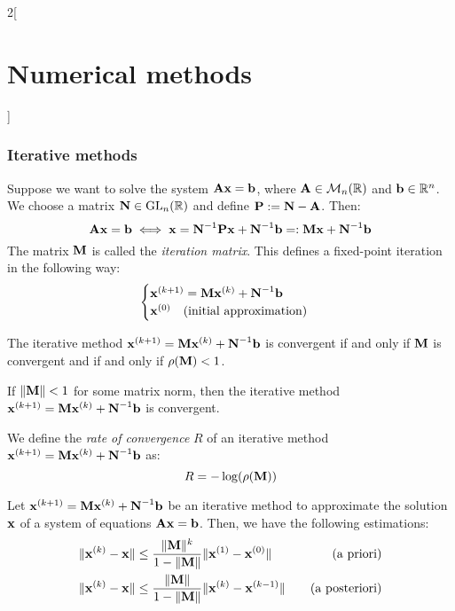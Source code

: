 \documentclass[../../../main_math.tex]{subfiles}
\begin{document}
\begin{multicols}{2}[\section{Numerical methods}]
  \subsubsection{Iterative methods}
  \begin{definition}
    Suppose we want to solve the system $\vf{A}\vf{x}=\vf{b}$, where $\vf{A}\in\mathcal{M}_n(\RR)$ and $\vf{b}\in\RR^n$. We choose a matrix $\vf{N}\in\GL_n(\RR)$ and define $\vf{P}:=\vf{N}-\vf{A}$. Then: $$\vf{A}\vf{x}=\vf{b}\iff \vf{x}=\vf{N}^{-1}\vf{P}\vf{x}+\vf{N}^{-1}\vf{b}=:\vf{M}\vf{x}+\vf{N}^{-1}\vf{b}$$ The matrix $\vf{M}$ is called the \emph{iteration matrix}. This defines a fixed-point iteration in the following way:
    \begin{equation*}
      \begin{cases}
        \vf{x}^{(k+1)}=\vf{M}\vf{x}^{(k)}+\vf{N}^{-1}\vf{b} \\
        \vf{x}^{(0)}\quad\text{(initial approximation)}
      \end{cases}
    \end{equation*}
  \end{definition}
  \begin{theorem}
    The iterative method $\vf{x}^{(k+1)}=\vf{M}\vf{x}^{(k)}+\vf{N}^{-1}\vf{b}$ is convergent if and only if $\vf{M}$ is convergent and if and only if $\rho(\vf{M})<1$.
  \end{theorem}
  \begin{corollary}
    If $\|\vf{M}\|<1$ for some matrix norm, then the iterative method $\vf{x}^{(k+1)}=\vf{M}\vf{x}^{(k)}+\vf{N}^{-1}\vf{b}$ is convergent.
  \end{corollary}
  \begin{definition}
    We define the \emph{rate of convergence} $R$ of an iterative method $\vf{x}^{(k+1)}=\vf{M}\vf{x}^{(k)}+\vf{N}^{-1}\vf{b}$ as: $$R=-\log(\rho(\vf{M}))$$
  \end{definition}
  \begin{proposition}
    Let $\vf{x}^{(k+1)}=\vf{M}\vf{x}^{(k)}+\vf{N}^{-1}\vf{b}$ be an iterative method to approximate the solution $\vf{x}$ of a system of equations $\vf{A}\vf{x}=\vf{b}$. Then, we have the following estimations:
    \begin{align*}
      \|\vf{x}^{(k)}-\vf{x}\| & \leq\frac{\|\vf{M}\|^k}{1-\|\vf{M}\|}\|\vf{x}^{(1)}-\vf{x}^{(0)}\|\quad & \text{(a priori)}     \\
      \|\vf{x}^{(k)}-\vf{x}\| & \leq\frac{\|\vf{M}\|}{1-\|\vf{M}\|}\|\vf{x}^{(k)}-\vf{x}^{(k-1)}\|\quad & \text{(a posteriori)}
    \end{align*}

\end{proposition}
\end{multicols}
\end{document}
